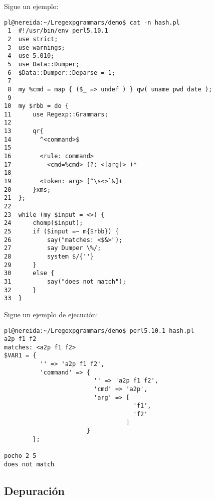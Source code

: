 
Sigue un ejemplo:
\begin{verbatim}
pl@nereida:~/Lregexpgrammars/demo$ cat -n hash.pl
 1  #!/usr/bin/env perl5.10.1
 2  use strict;
 3  use warnings;
 4  use 5.010;
 5  use Data::Dumper;
 6  $Data::Dumper::Deparse = 1;
 7
 8  my %cmd = map { ($_ => undef ) } qw( uname pwd date );
 9
10  my $rbb = do {
11      use Regexp::Grammars;
12
13      qr{
14        ^<command>$
15
16        <rule: command>
17          <cmd=%cmd> (?: <[arg]> )*
18
19        <token: arg> [^\s<>`&]+
20      }xms;
21  };
22
23  while (my $input = <>) {
24      chomp($input);
25      if ($input =~ m{$rbb}) {
26          say("matches: <$&>");
27          say Dumper \%/;
28          system $/{''}
29      }
30      else {
31          say("does not match");
32      }
33  }
\end{verbatim}

Sigue un ejemplo de ejecución:

\begin{verbatim}
pl@nereida:~/Lregexpgrammars/demo$ perl5.10.1 hash.pl
a2p f1 f2
matches: <a2p f1 f2>
$VAR1 = {
          '' => 'a2p f1 f2',
          'command' => {
                         '' => 'a2p f1 f2',
                         'cmd' => 'a2p',
                         'arg' => [
                                    'f1',
                                    'f2'
                                  ]
                       }
        };

pocho 2 5
does not match

\end{verbatim}

\subsection{Depuración}

